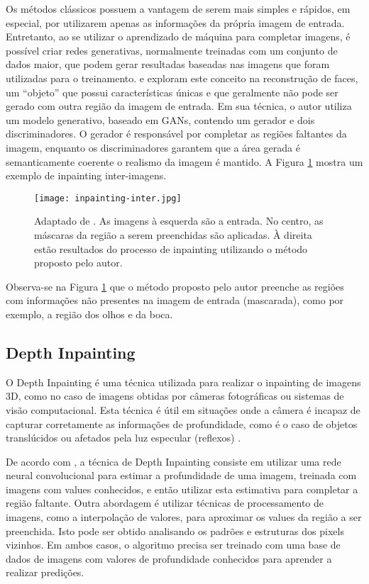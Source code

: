 Os métodos clássicos possuem a vantagem de serem mais simples e rápidos, em especial, por utilizarem apenas as informações da própria imagem de entrada. Entretanto, ao se utilizar o aprendizado de máquina para completar imagens, é possível criar redes generativas, normalmente treinadas com um conjunto de dados maior, que podem gerar resultadas baseadas nas imagens que foram utilizadas para o treinamento.
\cite{li2017generative} e \cite{liao2018face} exploram este conceito na reconstrução de faces, um ``objeto'' que possui características únicas e que geralmente não pode ser gerado com outra região da imagem de entrada. Em sua técnica, \cite{li2017generative} o autor utiliza um modelo generativo, baseado em GANs, contendo um gerador e dois discriminadores. O gerador é responsável por completar as regiões faltantes da imagem, enquanto os discriminadores garantem que a área gerada é semanticamente coerente o realismo da imagem é mantido. A Figura \ref{fig:inpainting-inter} mostra um exemplo de inpainting inter-imagens.

\begin{figure}[ht]
\centering
\texttt{[image: inpainting-inter.jpg]}
\caption{Adaptado de \cite{li2017generative}. As imagens à esquerda são a entrada. No centro, as máscaras da região a serem preenchidas são aplicadas. À direita estão resultados do processo de inpainting utilizando o método proposto pelo autor.}
\label{fig:inpainting-inter}
\end{figure}

Observa-se na Figura \ref{fig:inpainting-inter} que o método proposto pelo autor preenche as regiões com informações não presentes na imagem de entrada (mascarada), como por exemplo, a região dos olhos e da boca. 


\subsection{Depth Inpainting} \label{quality-depth}
O Depth Inpainting é uma técnica utilizada para realizar o inpainting de imagens 3D, como no caso de imagens obtidas por câmeras fotográficas ou sistemas de visão computacional. Esta técnica é útil em situações onde a câmera é incapaz de capturar corretamente as informações de profundidade, como é o caso de objetos translúcidos ou afetados pela luz especular (reflexos) \cite{shish20203dphoto}. 

De acordo com \cite{shish20203dphoto}, a técnica de Depth Inpainting consiste em utilizar uma rede neural convolucional para estimar a profundidade de uma imagem, treinada com imagens com values conhecidos, e então utilizar esta estimativa para completar a região faltante.
Outra abordagem é utilizar técnicas de processamento de imagens, como a interpolação de valores, para aproximar os values da região a ser preenchida. Isto pode ser obtido analisando os padrões e estruturas dos pixels vizinhos. Em ambos casos, o algoritmo precisa ser treinado com uma base de dados de imagens com valores de profundidade conhecidos para aprender a realizar predições.

